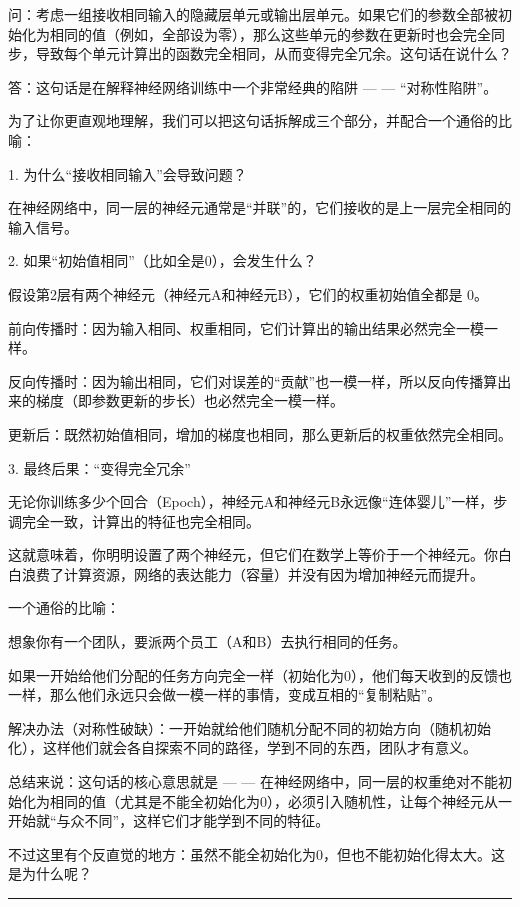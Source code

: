 \documentclass{article}
\begin{document}
{\color{blue}
问：考虑一组接收相同输入的隐藏层单元或输出层单元。如果它们的参数全部被初始化为相同的值（例如，全部设为零），那么这些单元的参数在更新时也会完全同步，导致每个单元计算出的函数完全相同，从而变得完全冗余。这句话在说什么？

答：这句话是在解释神经网络训练中一个非常经典的陷阱 — — “对称性陷阱”。

为了让你更直观地理解，我们可以把这句话拆解成三个部分，并配合一个通俗的比喻：

1. 为什么“接收相同输入”会导致问题？

在神经网络中，同一层的神经元通常是“并联”的，它们接收的是上一层完全相同的输入信号。

2. 如果“初始值相同”（比如全是0），会发生什么？

假设第2层有两个神经元（神经元A和神经元B），它们的权重初始值全都是 0。

前向传播时：因为输入相同、权重相同，它们计算出的输出结果必然完全一模一样。

反向传播时：因为输出相同，它们对误差的“贡献”也一模一样，所以反向传播算出来的梯度（即参数更新的步长）也必然完全一模一样。

更新后：既然初始值相同，增加的梯度也相同，那么更新后的权重依然完全相同。

3. 最终后果：“变得完全冗余”

无论你训练多少个回合（Epoch），神经元A和神经元B永远像“连体婴儿”一样，步调完全一致，计算出的特征也完全相同。

这就意味着，你明明设置了两个神经元，但它们在数学上等价于一个神经元。你白白浪费了计算资源，网络的表达能力（容量）并没有因为增加神经元而提升。

一个通俗的比喻：

想象你有一个团队，要派两个员工（A和B）去执行相同的任务。

如果一开始给他们分配的任务方向完全一样（初始化为0），他们每天收到的反馈也一样，那么他们永远只会做一模一样的事情，变成互相的“复制粘贴”。

解决办法（对称性破缺）：一开始就给他们随机分配不同的初始方向（随机初始化），这样他们就会各自探索不同的路径，学到不同的东西，团队才有意义。

总结来说：这句话的核心意思就是 — — 在神经网络中，同一层的权重绝对不能初始化为相同的值（尤其是不能全初始化为0），必须引入随机性，让每个神经元从一开始就“与众不同”，这样它们才能学到不同的特征。

不过这里有个反直觉的地方：虽然不能全初始化为0，但也不能初始化得太大。这是为什么呢？
}


\noindent\rule{\linewidth}{0.4pt}
\end{document}
